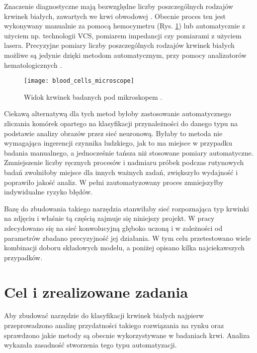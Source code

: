 {\parindent0pt %
Znaczenie diagnostyczne mają bezwzględne liczby poszczególnych rodzajów krwinek białych, zawartych we krwi obwodowej \cite{diagnostyka_laboratoryjna}. Obecnie proces ten jest wykonywany manualnie za pomocą hemocymetru (Rys. \ref{blood_cells_microscope}) lub automatycznie z użyciem np. technologii VCS, pomiarem impedancji czy pomiarami z użyciem lasera. Precyzyjne pomiary liczby poszczególnych rodzajów krwinek białych możliwe są jedynie dzięki metodom automatycznym, przy pomocy analizatorów hematologicznych \cite{diagnostyka_laboratoryjna}.

\begin{figure}[h]
	\centering
		\texttt{[image: blood\_cells\_microscope]}
	\caption{Widok krwinek badanych pod mikroskopem \cite{cells_microscope}.}
	\label{blood_cells_microscope}
\end{figure}


Ciekawą alternatywą dla tych metod byłoby zastosowanie automatycznego zliczania komórek opartego na klasyfikacji przynależności do danego typu na podstawie analizy obrazów przez sieć neuronową. Byłaby to metoda nie wymagająca ingerencji czynnika ludzkiego, jak to ma miejsce w przypadku badania manualnego, a jednocześnie tańsza niż stosowane pomiary automatyczne. Zmniejszenie liczby ręcznych procesów i nadmiaru próbek podczas rutynowych badań zwolniłoby miejsce dla innych ważnych zadań, zwiększyło wydajność i poprawiło jakość analiz. W pełni zautomatyzowany proces zmniejszyłby indywidualne ryzyko błędów.

Bazę do zbudowania takiego narzędzia stanwiłaby sieć rozpoznająca typ krwinki na zdjęciu i właśnie tą częścią zajmuje się niniejszy projekt. W pracy zdecydowano się na sieć konwolucyjną głęboko uczoną i w zależności od parametrów zbadano precyzyjność jej działania. W tym celu przetestowano wiele kombinacji doboru składowych modelu, a poniżej opisano kilka najciekawszych przypadków.
}
\section{Cel i zrealizowane zadania}
\label{sec:cel_i_zrealizowane_zadania}

Aby zbudować narzędzie do klasyfikacji krwinek białych najpierw przeprowadzono analizę przydatności takiego rozwiązania na rynku oraz sprawdzono jakie metody są obecnie wykorzystywane w badaniach krwi. Analiza wykazała zasadność stworzenia tego typu automatyzacji.

